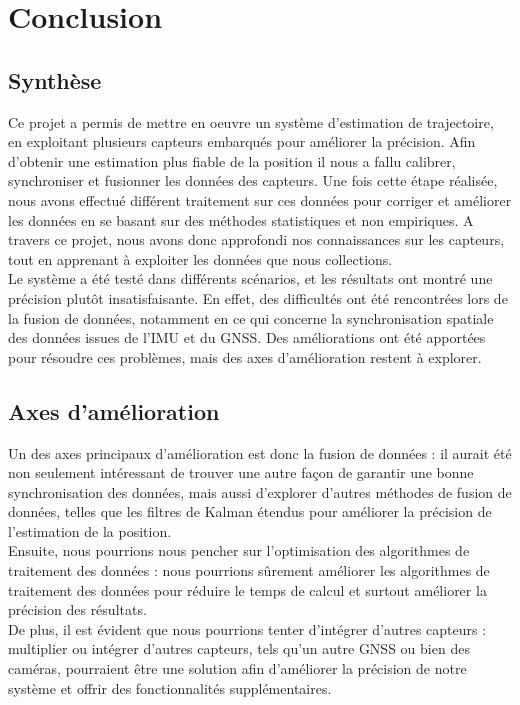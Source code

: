 \chapter{Conclusion}

\section{Synthèse}

Ce projet a permis de mettre en oeuvre un système d'estimation de trajectoire, en exploitant plusieurs capteurs embarqués pour améliorer la précision. Afin d'obtenir une estimation plus fiable de la position il nous a fallu calibrer, synchroniser et fusionner les données des capteurs. Une fois cette étape réalisée, nous avons effectué différent traitement sur ces données pour corriger et améliorer les données en se basant sur des méthodes statistiques et non empiriques. A travers ce projet, nous avons donc approfondi nos connaissances sur les capteurs, tout en apprenant à exploiter les données que nous collections.\\

Le système a été testé dans différents scénarios, et les résultats ont montré une précision plutôt insatisfaisante. En effet, des difficultés ont été rencontrées lors de la fusion de données, notamment en ce qui concerne la synchronisation spatiale des données issues de l'IMU et du GNSS. Des améliorations ont été apportées pour résoudre ces problèmes, mais des axes d'amélioration restent à explorer.

\section{Axes d’amélioration}

Un des axes principaux d'amélioration est donc la fusion de données :  il aurait été non seulement intéressant de trouver une autre façon de garantir une bonne synchronisation des données, mais aussi d'explorer d'autres méthodes de fusion de données, telles que les filtres de Kalman étendus pour améliorer la précision de l'estimation de la position.\\

Ensuite, nous pourrions nous pencher sur l'optimisation des algorithmes de traitement des données : nous pourrions sûrement améliorer les algorithmes de traitement des données pour réduire le temps de calcul et surtout améliorer la précision des résultats.\\

De plus, il est évident que nous pourrions tenter d'intégrer d'autres capteurs : multiplier ou intégrer d'autres capteurs, tels qu'un autre GNSS ou bien des caméras, pourraient être une solution afin d'améliorer la précision de notre système et offrir des fonctionnalités supplémentaires.\\

